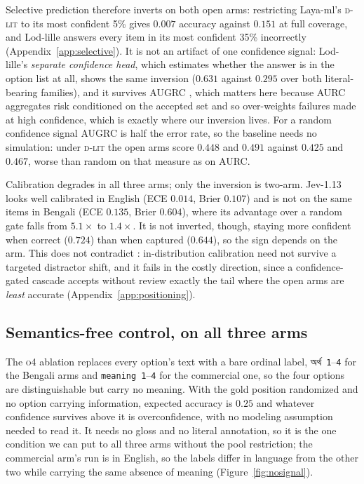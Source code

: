 \documentclass[11pt]{article}
\newcommand{\bangla}[1]{{\bn #1}}
\newcommand{\Dlit}{\textsc{d-lit}}
\begin{document}
Selective prediction therefore inverts on both open arms: restricting Laya-ml's
\Dlit{} to its most confident 5\% gives $0.007$ accuracy against $0.151$ at full
coverage, and Lod-lille answers every item in its most confident 35\% incorrectly
(Appendix~\ref{app:selective}). It is not an artifact of one confidence signal:
Lod-lille's \emph{separate confidence head}, which estimates whether the answer is
in the option list at all, shows the same inversion ($0.631$ against $0.295$ over
both literal-bearing families), and
it survives AUGRC
\citep{traub2024selective}, which matters here because AURC aggregates risk
conditioned on the accepted set and so over-weights failures made at high
confidence, which is exactly where our inversion lives. For a random confidence
signal AUGRC is half the error rate, so the baseline needs no simulation: under
\Dlit{} the open arms score $0.448$ and $0.491$ against $0.425$ and $0.467$, worse
than random on that measure as on AURC.

Calibration degrades in all three arms; only the inversion is two-arm. Jev-1.13
looks well calibrated in English (ECE $0.014$, Brier $0.107$) and is not on the
same items in Bengali (ECE $0.135$, Brier $0.604$), where its advantage over a
random gate falls from $5.1\times$ to $1.4\times$. It is not inverted, though,
staying more confident when correct ($0.724$) than when captured ($0.644$), so the
sign depends on the arm. This does not contradict \citet{ibrahim2026evaluating}:
in-distribution calibration need not survive a targeted distractor shift, and it
fails in the costly direction, since a confidence-gated cascade
\citep{li2026jevjudge} accepts without review exactly the tail where the open arms
are \emph{least} accurate
(Appendix~\ref{app:positioning}).

\subsection{Semantics-free control, on all three arms}
\label{sec:nosignal}

The \textsc{o4} ablation replaces every option's text with a bare ordinal label,
\bangla{অর্থ}~\texttt{1}--\texttt{4} for the Bengali arms and
\texttt{meaning}~\texttt{1}--\texttt{4} for the commercial one, so the four options are distinguishable but carry no meaning. With the gold
position randomized and no option carrying information, expected accuracy is
$0.25$ and whatever confidence survives above it is overconfidence, with no modeling
assumption needed to read it. It needs no gloss and no literal annotation, so it
is the one condition we can put to all three arms without the pool restriction;
the commercial arm's run is in English, so the labels differ in language from the
other two while carrying the same absence of meaning
(Figure~\ref{fig:nosignal}).
\end{document}
